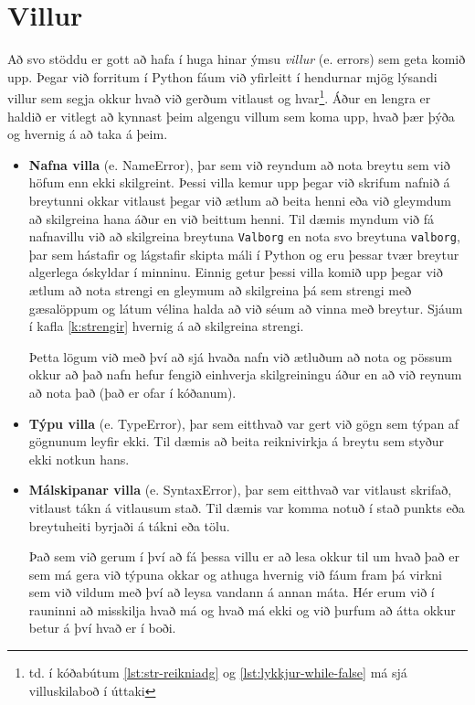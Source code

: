 \section{Villur}\label{uk:tolur-villur}
Að svo stöddu er gott að hafa í huga hinar ýmsu \emph{villur} (e. errors) sem geta komið upp.
Þegar við forritum í Python fáum við yfirleitt í hendurnar mjög lýsandi villur sem segja okkur hvað við gerðum vitlaust og hvar\footnote{td. í kóðabútum \ref{lst:str-reikniadg} og \ref{lst:lykkjur-while-false} má sjá villuskilaboð í úttaki}.
Áður en lengra er haldið er vitlegt að kynnast þeim algengu villum sem koma upp, hvað þær þýða og hvernig á að taka á þeim.

\begin{itemize}[leftmargin=*]
	\item \textbf{Nafna villa} (e. NameError), þar sem við reyndum að nota breytu sem við höfum enn ekki skilgreint.
	Þessi villa kemur upp þegar við skrifum nafnið á breytunni okkar vitlaust þegar við ætlum að beita henni eða við gleymdum að skilgreina hana áður en við beittum henni.
	Til dæmis myndum við fá nafnavillu við að skilgreina breytuna \texttt{Valborg} en nota svo breytuna \texttt{valborg}, þar sem hástafir og lágstafir skipta máli í Python og eru þessar tvær breytur algerlega óskyldar í minninu.
	Einnig getur þessi villa komið upp þegar við ætlum að nota strengi en gleymum að skilgreina þá sem strengi með gæsalöppum og látum vélina halda að við séum að vinna með breytur.
	Sjáum í kafla \ref{k:strengir} hvernig á að skilgreina strengi.
	
	Þetta lögum við með því að sjá hvaða nafn við ætluðum að nota og pössum okkur að það nafn hefur fengið einhverja skilgreiningu áður en að við reynum að nota það (það er ofar í kóðanum).
	
	\item \textbf{Týpu villa} (e. TypeError), þar sem eitthvað var gert við gögn sem týpan af gögnunum leyfir ekki.
	Til dæmis að beita reiknivirkja á breytu sem styður ekki notkun hans.
	\item \textbf{Málskipanar villa} (e. SyntaxError), þar sem eitthvað var vitlaust skrifað, vitlaust tákn á vitlausum stað.
	Til dæmis var komma notuð í stað punkts eða breytuheiti byrjaði á tákni eða tölu.
	
	Það sem við gerum í því að fá þessa villu er að lesa okkur til um hvað það er sem má gera við týpuna okkar og athuga hvernig við fáum fram þá virkni sem við vildum með því að leysa vandann á annan máta.
	Hér erum við í rauninni að misskilja hvað má og hvað má ekki og við þurfum að átta okkur betur á því hvað er í boði.
	

\end{itemize}
